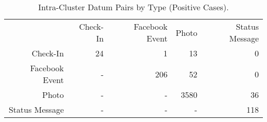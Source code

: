 \begin{table}[htp]
	\begin{center}
	\caption{Intra-Cluster Datum Pairs by Type (Positive Cases).}
	\label{tab:table_intra_xtype_cluster}
		\begin{tabular}{r r r r r }
		\toprule
			 & Check-In & Facebook Event & Photo & Status Message\\
			Check-In & 24 & 1 & 13 & 0\\
			Facebook Event & - & 206 & 52 & 0\\
			Photo & - & - & 3580 & 36\\
			Status Message & - & - & - & 118\\
		\bottomrule
		\end{tabular}
	\end{center}
\end{table}